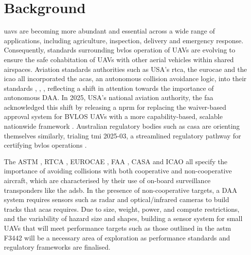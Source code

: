 \chapter{Background}
\label{ch:background}

\gls{uav}s are becoming more abundant and essential across a wide range of
applications, including agriculture, inspection, delivery and emergency response.
Consequently, standards surrounding \gls{bvlos} operation of UAVs are evolving to ensure
the safe cohabitation of UAVs with other aerial vehicles within shared airspaces.
Aviation standards authorities such as USA's \gls{rtca}, the \gls{eurocae} and the
\gls{icao} all incorporated the \gls{acas}, an autonomous collision avoidance logic, 
into their standards \cite{rtca_do386_2020},
\cite{eurocae_ed275_2020}, \cite{icao_annex10_vol4_amend91},
reflecting a shift in attention towards the importance of autonomous DAA. In 2025,
USA's national aviation authority, the \gls{faa}
acknowledged this shift by releasing a \gls{nprm} for
replacing the waiver-based approval system for BVLOS UAVs with a more
capability-based, scalable nationwide framework
\cite{faa_part108_nprm_2025}. Australian regulatory bodies such as \gls{casa} are
orienting themselves similarly, trialing \gls{tmi} 2025-03, a streamlined regulatory
pathway for certifying \gls{bvlos} operations \cite{casa_tmi202503}.

The ASTM \cite{astm_f3442_2023}, RTCA \cite{rtca_do365c_2022},
EUROCAE \cite{eurocae_ed322}, FAA \cite{faa_part108_nprm_2025},
CASA \cite{casa_tmi202503} and ICAO \cite{icao_annex10_vol4_amend91} all specify 
the importance of avoiding collisions with both 
cooperative and non-cooperative
aircraft, which are characterised by their use of on-board surveillance 
transponders
like the \gls{adsb}. In the presence of
non-cooperative targets, a DAA system requires sensors such as radar and
optical/infrared cameras to build tracks that \gls{acas} requires. Due to size, weight,
power, and compute restrictions, and the variability of hazard size and shapes,
building a sensor system for small UAVs that will meet performance targets such as
those outlined in the \gls{astm} F3442 \cite{astm_f3442_2023} will be a necessary area of
exploration as performance standards and regulatory frameworks are finalised.




